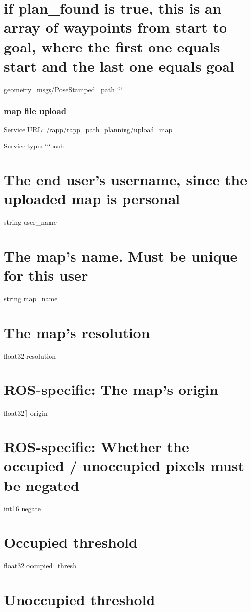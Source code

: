 \section*{if plan\-\_\-found is true, this is an array of waypoints from start to goal, where the first one equals start and the last one equals goal}

geometry\-\_\-msgs/\-Pose\-Stamped\mbox{[}\mbox{]} path ```

\subsubsection*{map file upload}

Service U\-R\-L\-: {\ttfamily /rapp/rapp\-\_\-path\-\_\-planning/upload\-\_\-map}

Service type\-: ```bash \section*{The end user's username, since the uploaded map is personal}

string user\-\_\-name \section*{The map's name. Must be unique for this user}

string map\-\_\-name \section*{The map's resolution}

float32 resolution \section*{R\-O\-S-\/specific\-: The map's origin}

float32\mbox{[}\mbox{]} origin \section*{R\-O\-S-\/specific\-: Whether the occupied / unoccupied pixels must be negated}

int16 negate \section*{Occupied threshold}

float32 occupied\-\_\-thresh \section*{Unoccupied threshold}

